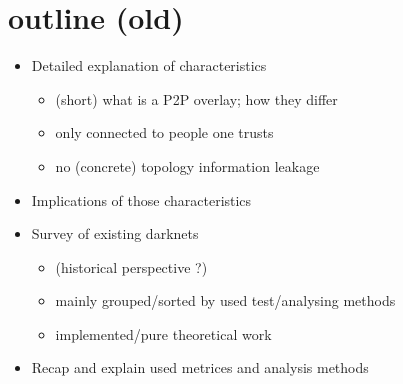 \section{outline (old)}
\begin{itemize}
\item    Detailed explanation of characteristics
\begin{itemize}
\item        (short) what is a P2P overlay; how they differ
\item        only connected to people one trusts
\item        no (concrete) topology information leakage
\end{itemize}
\item    Implications of those characteristics
\item    Survey of existing darknets
\begin{itemize}
\item        (historical perspective ?)
\item        mainly grouped/sorted by used test/analysing methods
\item        implemented/pure theoretical work
\end{itemize}
\item    Recap and explain used metrices and analysis methods
\end{itemize}
